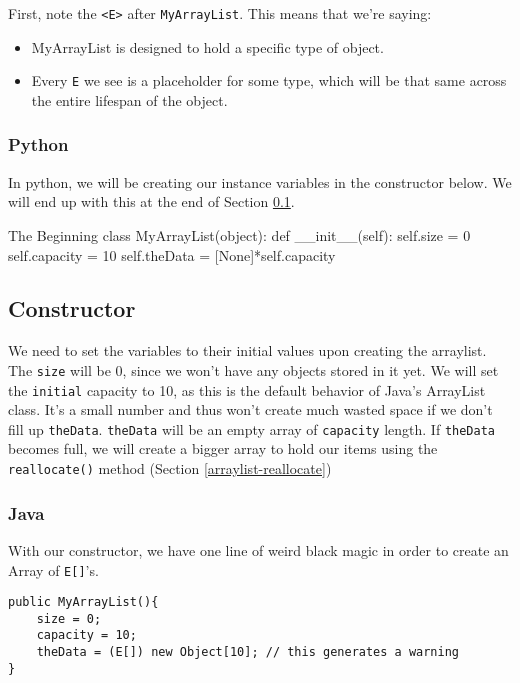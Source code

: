 First, note the \texttt{<E>} after \texttt{MyArrayList}.  This means that we're saying:
\begin{itemize}
	\item MyArrayList is designed to hold a specific type of object.
	\item Every \texttt{E} we see is a placeholder for some type, which will be that same across the entire lifespan of the object.
\end{itemize}


\subsubsection{Python}
In python, we will be creating our instance variables in the constructor below.  We will end up with this at the end of Section \ref{arraylist-constructor}.


\begin{pycode}[label={code:MyArrayListInstancePython}]{The Beginning}
class MyArrayList(object):
	def __init__(self):
		self.size = 0
		self.capacity = 10
		self.theData = [None]*self.capacity
\end{pycode}



\subsection{Constructor}
\label{arraylist-constructor}

We need to set the variables to their initial values upon creating the arraylist.
The \texttt{size} will be 0, since we won't have any objects stored in it yet.
We will set the \texttt{initial} capacity to 10, as this is the default behavior of Java's ArrayList class.  
It's a small number and thus won't create much wasted space if we don't fill up \texttt{theData}.
\texttt{theData} will be an empty array of \texttt{capacity} length.
If \texttt{theData} becomes full, we will create a bigger array to hold our items using the \texttt{reallocate()} method (Section \ref{arraylist-reallocate})  %


\subsubsection{Java}
With our constructor, we have one line of weird black magic in order to create an Array of \texttt{E[]}'s.
\begin{verbatim}
public MyArrayList(){
	size = 0;
	capacity = 10;
	theData = (E[]) new Object[10]; // this generates a warning
}
\end{verbatim}

